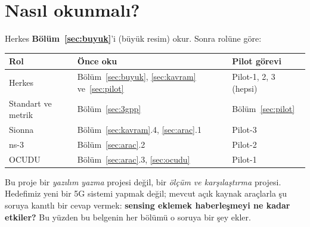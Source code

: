 \tableofcontents
\clearpage

\section*{Nasıl okunmalı?}

Herkes \textbf{Bölüm~\ref{sec:buyuk}}'i (büyük resim) okur. Sonra rolüne göre:

\begingroup\sffamily\small
\begin{xltabular}{\textwidth}{@{}lXl@{}}
\toprule
\textbf{Rol} & \textbf{Önce oku} & \textbf{Pilot görevi} \\
\midrule
Herkes & Bölüm~\ref{sec:buyuk}, \ref{sec:kavram} ve~\ref{sec:pilot} & Pilot-1, 2, 3 (hepsi) \\
Standart ve metrik & Bölüm~\ref{sec:3gpp} & Bölüm~\ref{sec:pilot} \\
Sionna & Bölüm~\ref{sec:kavram}.4, \ref{sec:arac}.1 & Pilot-3 \\
ns-3 & Bölüm~\ref{sec:arac}.2 & Pilot-2 \\
OCUDU & Bölüm~\ref{sec:arac}.3, \ref{sec:ocudu} & Pilot-1 \\
\bottomrule
\end{xltabular}
\endgroup

\begin{ipucu}
Bu proje bir \emph{yazılım yazma} projesi değil, bir \emph{ölçüm ve karşılaştırma} projesi. Hedefimiz yeni bir 5G sistemi yapmak değil;
mevcut açık kaynak araçlarla şu soruya kanıtlı bir cevap vermek: \textbf{sensing eklemek haberleşmeyi ne kadar etkiler?}
Bu yüzden bu belgenin her bölümü o soruya bir şey ekler.
\end{ipucu}
